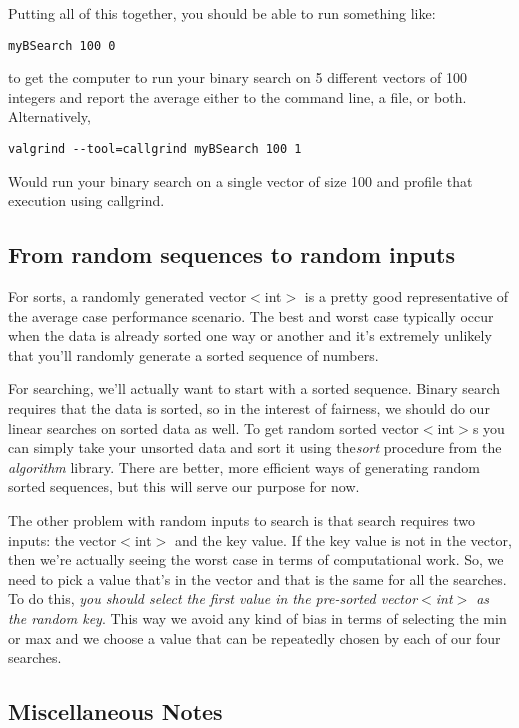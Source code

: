 \documentclass[]{tufte-handout}
\begin{document}
Putting all of this together, you should be able to run something like:
\begin{verbatim}
myBSearch 100 0
\end{verbatim}
to get the computer to run your binary search on 5 different vectors of 100 integers and report the average either to the command line, a file, or both. Alternatively, 
\begin{verbatim}
valgrind --tool=callgrind myBSearch 100 1
\end{verbatim}
Would run your binary search on a single vector of size 100 and profile that execution using callgrind.

\subsection{From random sequences to random inputs}

For sorts, a randomly generated vector$<$int$>$ is a pretty good representative of the average case performance scenario. The best and worst case typically occur when the data is already sorted one way or another and it's extremely unlikely that you'll randomly generate a sorted sequence of numbers. 

For searching, we'll actually want to start with a sorted sequence. Binary search requires that the data is sorted, so in the interest of fairness, we should do our linear searches on sorted data as well. To get random sorted vector$<$int$>$s you can simply take your unsorted data and sort it using the\textit{sort} procedure from the \textit{algorithm} library.  There are better, more efficient ways of generating random sorted sequences, but this will serve our purpose for now. 

The other problem with random inputs to search is that search requires two inputs: the vector$<$int$>$ and the key value.  If the key value is not in the vector, then we're actually seeing the worst case in terms of computational work. So, we need to pick a value that's in the vector and that is the same for all the searches. To do this, \textit{you should select the first value in the pre-sorted vector$<$int$>$ as the random key}. This way we avoid any kind of bias in terms of selecting the min or max and we choose a value that can be repeatedly chosen by each of our four searches. 

\subsection{Miscellaneous Notes}
\end{document}
